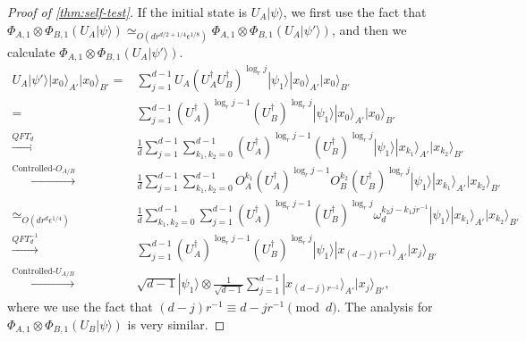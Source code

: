 \documentclass[11pt,letterpaper]{article}
\newcommand{\ket}[1]{|#1\rangle}
\newcommand{\x}{\otimes}
\newcommand{\ct}{^{\dagger}}
\newcommand{\1}{\mathbb{1}}
\newcommand{\ep}{\epsilon}
\newcommand{\qe}{\epsilon^{1/4}}
\newcommand{\appd}[1]{\simeq_{#1}}
\theoremstyle{definition}
\begin{document}
\begin{proof}[Proof of \cref{thm:self-test}]
If the initial state is $U_A\ket{\psi}$, we first use the fact that 
$ \Phi_{A,1} \x \Phi_{B,1} (U_A\ket{\psi}) \appd{O(d r^{d/2+1/4} \ep^{1/8})}  \Phi_{A,1} \x \Phi_{B,1} (U_A\ket{\psi'})$, 
and then we calculate $\Phi_{A,1} \x \Phi_{B,1} (U_A\ket{\psi'})$.
\begin{align*}
	U_A \ket{\psi'} \ket{x_0}_{A'}\ket{x_0}_{B'} =&  
		\sum_{j=1}^{d-1} U_A(U_A\ct U_B\ct)^{\log_r j}\ket{\psi_1} \ket{x_0}_{A'}\ket{x_0}_{B'}\\
		=&\sum_{j=1}^{d-1}(U_A\ct)^{\log_r j-1}  (U_B\ct)^{\log_r j} \ket{\psi_1} \ket{x_0}_{A'}\ket{x_0}_{B'}\\
		\xrightarrow[]{QFT_d} &\frac{1}{d}\sum_{j=1}^{d-1} \sum_{k_1,k_2 = 0}^{d-1}(U_A\ct)^{\log_r j-1} (U_B\ct)^{\log_r j} \ket{\psi_1}  \ket{x_{k_1}}_{A'}\ket{x_{k_2}}_{B'}\\
		\xrightarrow[]{\text{Controlled-}O_{A/B}}&\frac{1}{d}\sum_{j=1}^{d-1}\sum_{k_1,k_2 = 0}^{d-1} 
		 O_A^{k_1}(U_A\ct)^{\log_r j-1} O_B^{k_2}(U_B\ct)^{\log_r j} \ket{\psi_1} 
		 \ket{x_{k_1}}_{A'}\ket{x_{k_2}}_{B'}\\
		\appd{O(d r^{d} \qe)}& \frac{1}{d}\sum_{k_1,k_2 = 0}^{d-1} \sum_{j=1}^{d-1} (U_A\ct)^{\log_r j-1} (U_B\ct)^{\log_r j}
		\omega_d^{k_2j-k_1jr^{-1}}\ket{\psi_1}
		 \ket{x_{k_1}}_{A'}\ket{x_{k_2}}_{B'}\\
		\xrightarrow[]{QFT_d^{-1}}& \sum_{j=1}^{d-1}  (U_A\ct)^{\log_r j-1} (U_B\ct)^{\log_r j}  
		\ket{\psi_1} \ket{x_{(d-j)r^{-1}}}_{A'}\ket{x_j}_{B'}\\
		\xrightarrow[]{\text{Controlled-}U_{A/B}}& \sqrt{d-1} \ket{\psi_1} \x  
		\frac{1}{\sqrt{d-1}} \sum_{j=1}^{d-1} \ket{x_{(d-j)r^{-1}}}_{A'}\ket{x_j}_{B'},
\end{align*}
where we use the fact that $(d-j)r^{-1} \equiv d -jr^{-1} \pmod{d}$.
The analysis for $\Phi_{A,1} \x\Phi_{B,1} (U_B \ket{\psi})$ is very similar.
\end{proof}
\end{document}
